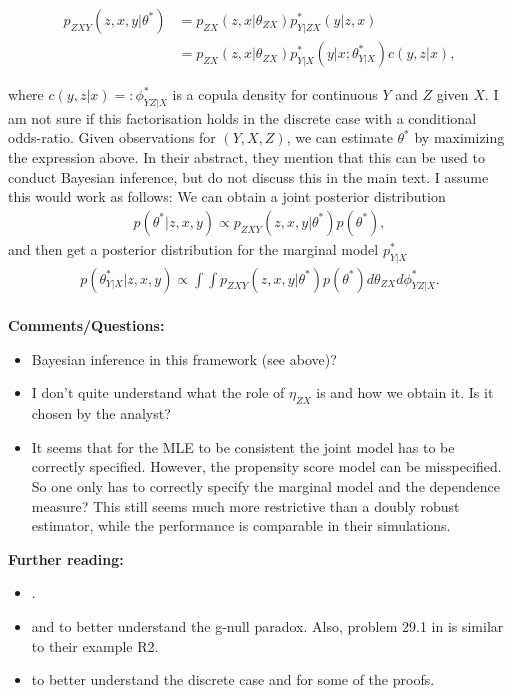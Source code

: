 \documentclass[10pt]{article}
\begin{document}
\begin{align*}
	p_{ZXY}(z, x, y | \theta^*) &= p_{ZX}(z, x | \theta_{ZX}) p_{Y|ZX}^*(y|z, x) \\
	&= p_{ZX}(z, x | \theta_{ZX}) p_{Y|X}^*(y | x; \theta_{Y|X}^*) c(y, z| x),
\end{align*}

where $c(y, z | x) =: \phi_{YZ | X}^* $ is a copula density for continuous $Y$ and $Z$ given $X$. I am not sure if this factorisation holds in the discrete case with a conditional odds-ratio. Given observations for $(Y, X, Z)$, we can estimate $\theta^*$ by maximizing the expression above. 
In their abstract, they mention that this can be used to conduct Bayesian inference, but do not discuss this in the main text. I assume this would work as follows: We can obtain a joint posterior distribution
\begin{align*}
	p(\theta^* | z, x, y) \propto p_{ZXY}(z, x, y | \theta^*) p(\theta^*),
\end{align*}
and then get a posterior distribution for the marginal model $p_{Y|X}^*$
\begin{align*}
	p(\theta_{Y|X}^* | z, x, y) \propto \int \int p_{ZXY}(z, x, y | \theta^*) p(\theta^*) d\theta_{ZX} d\phi_{YZ | X}^*.
\end{align*} \\



\textbf{Comments/Questions:}
\begin{itemize}
	\item Bayesian inference in this framework (see above)?
	\item I don't quite understand what the role of $\eta_{ZX}$ is and how we obtain it. Is it chosen by the analyst?
	\item It seems that for the MLE to be consistent the joint model has to be correctly specified. However, the propensity score model can be misspecified. So one only has to correctly specify the marginal model and the dependence measure? This still seems much more restrictive than a doubly robust estimator, while the performance is comparable in their simulations.
\end{itemize}

\textbf{Further reading:} 
\begin{itemize}
	\item \cite{saarela_2015}.
	\item \cite{robins_wasserman_1997} and \cite{mcgrath2022revisiting} to better understand the g-null paradox. Also, problem 29.1 in \cite{ding2023course} is similar to their example R2.
	\item \cite{Bergsma_Rudas_2002} to better understand the discrete case and for some of the proofs.
\end{itemize}










\end{document}
